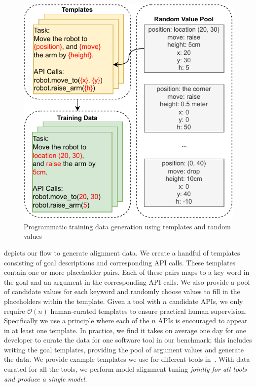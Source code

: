 \begin{figure}
\vspace{-12pt}
\caption{Programmatic training data generation using templates and random values}\label{fig:data_gen}
\centering
\vspace{-6pt}
\includegraphics[width=\linewidth]{plots/data_gen.pdf}
\end{figure} 
 depicts our flow to generate alignment data.
We create a handful of templates consisting of goal descriptions and corresponding API calls. 
These templates contain one or more placeholder pairs. Each of these pairs maps to a key word in the goal and an argument in the corresponding API calls. 
We also provide a pool of candidate values for each keyword and randomly choose values to fill in the placeholders within the template. 
Given a tool with $n$ candidate APIs, we only require $\mathcal{O}(n)$ human-curated templates to ensure practical human supervision. Specifically we use a principle where each of the $n$ APIs is encouraged to appear in at least one template. 
In practice, we find it takes on average one day for one developer to curate the data for one software tool in our benchmark; this includes writing the goal templates, providing the pool of argument values and generate the data. We provide example templates we use for different tools in~. 
With data curated for all the tools, we perform model alignment tuning \emph{jointly for all tools and produce a single model}.




